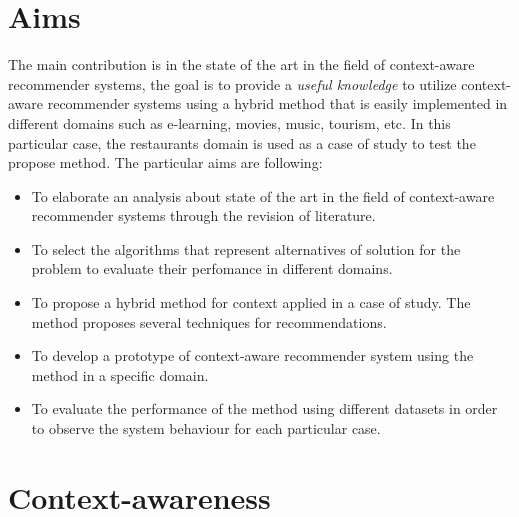 \section{Aims}

The main contribution is in the state of the art in the field of
context-aware recommender systems, the goal is to provide a
\textit{useful knowledge} to utilize context-aware recommender systems
using a hybrid method that is easily implemented in different domains
such as e-learning, movies, music, tourism, etc. In this particular
case, the restaurants domain is used as a case of study to  test the
propose method. The particular aims are following:
\begin{itemize}  
\item To elaborate an analysis about state of the art in the field
of context-aware recommender systems through  the revision of
literature. 
\item To select the algorithms that represent alternatives of 
solution for the problem to evaluate their perfomance in different domains.
\item To propose a hybrid method for context applied in a case of study.  The method proposes several techniques for recommendations.
\item To develop a prototype of context-aware recommender system 
using the method in a specific domain.
\item To evaluate the performance of the method using 
different datasets in order to observe the system behaviour 
for each particular case.
\end{itemize} 

\section{Context-awareness} \label{context-awareness}

